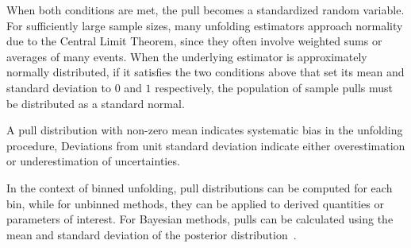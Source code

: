             When both conditions are met, the pull becomes a standardized random variable.
            For sufficiently large sample sizes, many unfolding estimators approach normality due to the Central Limit Theorem, since they often involve weighted sums or averages of many events.
            When the underlying estimator is approximately normally distributed, if it satisfies the two conditions above that set its mean and standard deviation to \(0\) and \(1\) respectively, the population of sample pulls must be distributed as a standard normal.
            
            A pull distribution with non-zero mean indicates systematic bias in the unfolding procedure,
            Deviations from unit standard deviation indicate either overestimation or underestimation of uncertainties.
            
            In the context of binned unfolding, pull distributions can be computed for each bin, while for unbinned methods, they can be applied to derived quantities or parameters of interest.
            For Bayesian methods, pulls can be calculated using the mean and standard deviation of the posterior distribution~\cite{Knapik2012BayesianPriors}.
